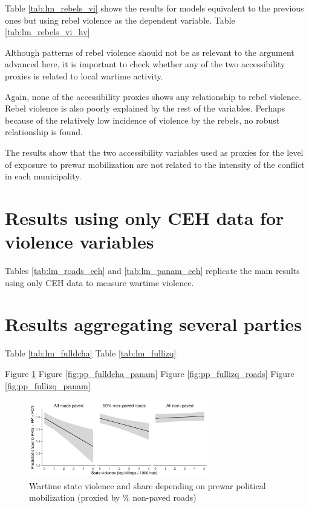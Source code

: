 \documentclass[a4paper, 12pt, notitlepage]{article}
\begin{document}
Table \ref{tab:lm_rebels_vi} shows the results for models equivalent to the previous ones but using rebel violence as the dependent variable.
Table \ref{tab:lm_rebels_vi_hv}


Although patterns of rebel violence should not be as relevant to the argument advanced here, it is important to check whether any of the two accessibility proxies is related to local wartime activity.

Again, none of the accessibility proxies shows any relationship to rebel violence.
Rebel violence is also poorly explained by the rest of the variables.
Perhaps because of the relatively low incidence of violence by the rebels, no robust relationship is found.

The results show that the two accessibility variables used as proxies for the level of exposure to prewar mobilization are not related to the intensity of the conflict in each municipality.






\clearpage
\section{Results using only CEH data for violence variables}\label{app:results_ceh}

Tables \ref{tab:lm_roads_ceh} and \ref{tab:lm_panam_ceh} replicate the main results using only CEH data to measure wartime violence.




\clearpage
\section{Results aggregating several parties}\label{app:results_full}

Table \ref{tab:lm_fulldcha}
Table \ref{tab:lm_fullizq}

Figure \ref{fig:pp_fulldcha_roads}
Figure \ref{fig:pp_fulldcha_panam}
Figure \ref{fig:pp_fullizq_roads}
Figure \ref{fig:pp_fullizq_panam}




\begin{figure}[htb!]
  \centering
    \includegraphics[width = 0.7\textwidth]{img/pp_fulldcha_roads}

  \caption{Wartime state violence and {} share depending on prewar political mobilization (proxied by \% non-paved roads)} \label{fig:pp_fulldcha_roads}

\end{figure}
\end{document}
